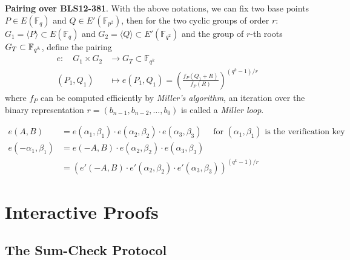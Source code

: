 \documentclass{article}
\begin{document}
\textbf{Pairing over BLS12-381}. With the above notations, we can fix two base points $P \in E(\mathbb{F}_q)$ and $Q \in E'(\mathbb{F}_{p^2})$, then for the two cyclic groups of order $r$: $G_1 = \langle P \rangle \subset E(\mathbb{F}_q)$ and $G_2 = \langle Q \rangle \subset E'(\mathbb{F}_{q^2})$ and the group of $r$-th roots $G_T \subset \mathbb{\mathbb{F}}_{q^k}$, define the pairing
\begin{equation*}
\begin{split}
e: \quad G_1 \times G_2 & \rightarrow G_{T} \subset \mathbb{F}_{q^k} \\
(P_1, Q_1) & \mapsto e(P_1, Q_1) = (\frac{f_P(Q_1 + R)}{f_P(R)})^{(q^k - 1) / r}
\end{split}
\end{equation*}
where $f_P$ can be computed efficiently by \textit{Miller's algorithm}, an iteration over the binary representation $r = (b_{n-1}, b_{n-2}, \dots, b_0)$ is called a \textit{Miller loop}. 

\begin{equation*}
\begin{split}
e(A, B) &= e(\alpha_1, \beta_1) \cdot e(\alpha_2, \beta_2) \cdot e(\alpha_3, \beta_3) \quad \text{ for } (\alpha_1, \beta_1) \text{ is the verification key} \\
e(-\alpha_1, \beta_1) &= e(-A, B) \cdot  e(\alpha_2, \beta_2) \cdot e(\alpha_3, \beta_3) \\
& = \left( e'(-A, B) \cdot  e'(\alpha_2, \beta_2) \cdot e'(\alpha_3, \beta_3) \right)^{(q^k - 1) / r}
\end{split}
\end{equation*}



\section{Interactive Proofs}


\subsection{The Sum-Check Protocol}
\end{document}
